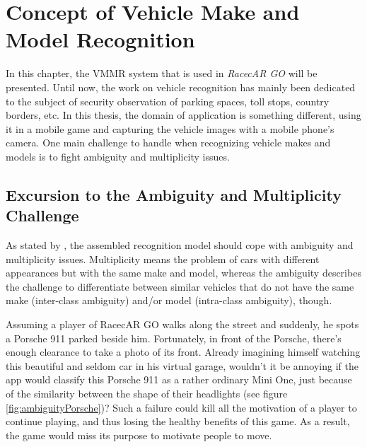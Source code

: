 \section{Concept of Vehicle Make and Model Recognition}\label{sec:vmmrConcept}
In this chapter, the VMMR system that is used in \emph{RacecAR GO} will be presented. Until now, the work on vehicle recognition has mainly been dedicated to the subject of security observation of parking spaces, toll stops, country borders, etc. In this thesis, the domain of application is something different, using it in a mobile game and capturing the vehicle images with a mobile phone's camera. One main challenge to handle when recognizing vehicle makes and models is to fight ambiguity and multiplicity issues.

\subsection{Excursion to the Ambiguity and Multiplicity Challenge}\label{sec:excursionAmbiguity}
As stated by \citep{siddiqui2015robust}, the assembled recognition model should cope with ambiguity and multiplicity issues. Multiplicity means the problem of cars with different appearances but with the same make and model, whereas the ambiguity describes the challenge to differentiate between similar vehicles that do not have the same make (inter-class ambiguity) and/or model (intra-class ambiguity), though.

Assuming a player of RacecAR GO walks along the street and suddenly, he spots a Porsche 911 parked beside him. Fortunately, in front of the Porsche, there's enough clearance to take a photo of its front. Already imagining himself watching this beautiful and seldom car in his virtual garage, wouldn't it be annoying if the app would classify this Porsche 911 as a rather ordinary Mini One, just because of the similarity between the shape of their headlights (see figure \ref{fig:ambiguityPorsche})? Such a failure could kill all the motivation of a player to continue playing, and thus losing the healthy benefits of this game. As a result, the game would miss its purpose to motivate people to move.

